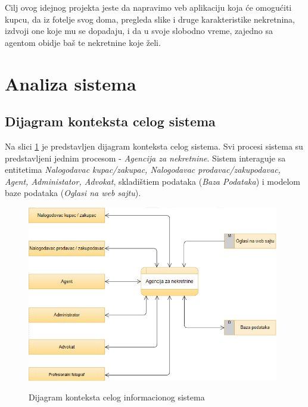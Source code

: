 \documentclass[20pt]{article}
\begin{document}
\indent Cilj ovog idejnog projekta jeste da napravimo veb aplikaciju koja \' ce omogu\' citi kupcu, da iz fotelje svog doma, pregleda slike i druge karakteristike nekretnina, izdvoji one koje mu se dopadaju, i da u svoje slobodno vreme, zajedno sa agentom obidje ba\v s te nekretnine koje \v zeli.\\

\newpage
\section{\bfseries \Large Analiza sistema}
\setlength{\parindent}{1cm}
\fontsize{13}{18} \selectfont 

\subsection{\bfseries \Large Dijagram konteksta celog sistema}
Na slici \ref{fig:dijagramKontekstaCelogIS} je predstavljen dijagram konteksta celog sistema. Svi procesi sistema su predstavljeni jednim procesom - {\it Agencija za nekretnine}. Sistem interaguje sa entitetima {\it Nalogodavac kupac/zakupac, Nalogodavac prodavac/zakupodavac, Agent, Administator, Advokat}, skladi\v{s}tiem podataka ({\it Baza Podataka}) i modelom baze podataka ({\it Oglasi na web sajtu}).

\begin{figure}[h]
		\centering
		\includegraphics[width=0.98\textwidth,height=0.5\textheight]{Pictures/DijagramKontekstaCelogSistema}\\
		\caption{Dijagram konteksta celog informacionog sistema}
		\label{fig:dijagramKontekstaCelogIS}
	\end{figure}
\end{document}
